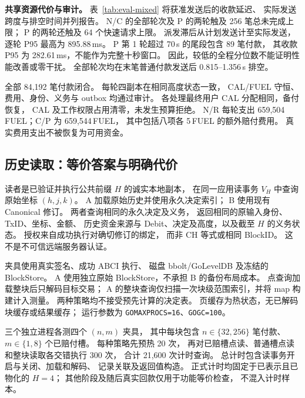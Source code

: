 \noindent\textbf{共享资源代价与审计。}
表~\ref{tab:eval-mixed} 将获准发送后的收款延迟、
实际发送跨度与排空时间并列报告。
N/C 的全部轮次及 P 的两轮触及 256 笔总未完成上限；
P 的两轮还触及 64 个快速请求上限。
派发滞后从计划发送计至实际发送，
逐轮 P95 最高为 895.88\,ms。
P 第 1 轮超过 70\,s 的尾段包含 89 笔付款，
其收款 P95 为 282.61\,ms，不能作为完整十秒窗口。
因此，较低的全程分位数不能证明性能改善或零干扰。
全部轮次均在末笔普通付款发送后 0.815--1.356\,s 排空。

全部 84,192 笔付款闭合。
每轮四副本在相同高度状态一致，
CAL/FUEL 守恒、费用、身份、义务与 outbox 均通过审计。
各处理最终用户 CAL 分配相同，备付恢复，
CAL 及工作权限占用清零，未发生预算拒绝。
N/R 每轮支出 659,504\,FUEL；C/P 为 659,544\,FUEL，
其中包括八项各 5\,FUEL 的额外赔付费用。
真实费用支出不被恢复为可用资金。

\subsection{历史读取：等价答案与明确代价}
\label{sec:eval-reader}

读者是已验证并执行公共前缀 $H$ 的诚实本地副本，
在同一应用读事务 $V_H$ 中查询原始坐标 $(h,j,k)$。
A 加载原始历史并使用永久决定索引；
B 使用现有 Canonical 修订。
两者查询相同的永久决定及义务，
返回相同的原输入身份、TxID、坐标、金额、
历史资金来源与 Debit、决定及高度，以及截至 $H$ 的义务状态。
授权来自成功执行对确切修订的绑定，
而非 CH 等式或相同 BlockID。
这不是不可信远端服务器认证。

夹具使用真实签名、成功 ABCI 执行、
磁盘 bbolt/GoLevelDB 及冻结的 BlockStore。
A 使用独立原始 BlockStore，不承担 B 的备份布局成本。
点查询加载整块后只解码目标交易；
A 的整块查询仅扫描一次块级范围索引，并将 map 构建计入测量。
两种策略均不接受预先计算的决定表。
页缓存为热状态，无已解码块缓存或结果缓存；
运行参数为 \texttt{GOMAXPROCS=16}、\texttt{GOGC=100}。

三个独立进程各测四个 $(n,m)$ 夹具，
其中每块包含 $n\in\{32,256\}$ 笔付款、
$m\in\{1,8\}$ 个已赔付槽。
每种策略先预热 20 次，
再对已赔槽点读、普通槽点读和整块读取各交错执行 300 次，
合计 21,600 次计时查询。
总计时包含读事务开启与关闭、加载和解码、
记录关联及返回值构造。
正式计时均固定于已表示且已物化的 $H=4$；
其他阶段及随后真实回款仅用于功能等价检查，
不混入计时样本。


